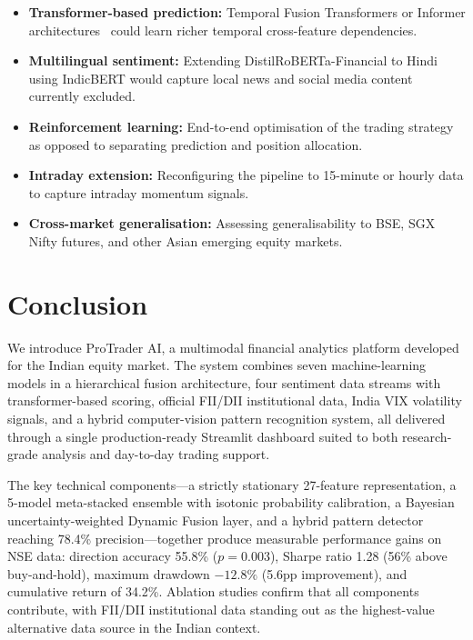 \documentclass[10pt,a4paper,twoside]{article}
\begin{document}
\begin{itemize}
\item \textbf{Transformer-based prediction:} Temporal Fusion Transformers or
  Informer architectures~\cite{vaswani2017} could learn richer temporal
  cross-feature dependencies.
\item \textbf{Multilingual sentiment:} Extending DistilRoBERTa-Financial to
  Hindi using IndicBERT would capture local news and social media content
  currently excluded.
\item \textbf{Reinforcement learning:} End-to-end optimisation of the trading
  strategy as opposed to separating prediction and position allocation.
\item \textbf{Intraday extension:} Reconfiguring the pipeline to 15-minute or
  hourly data to capture intraday momentum signals.
\item \textbf{Cross-market generalisation:} Assessing generalisability to
  BSE, SGX Nifty futures, and other Asian emerging equity markets.
\end{itemize}

\section{Conclusion}

We introduce ProTrader AI, a multimodal financial analytics platform developed
for the Indian equity market. The system combines seven machine-learning
models in a hierarchical fusion architecture, four sentiment data streams with
transformer-based scoring, official FII/DII institutional data, India VIX
volatility signals, and a hybrid computer-vision pattern recognition system,
all delivered through a single production-ready Streamlit dashboard suited to
both research-grade analysis and day-to-day trading support.

The key technical components---a strictly stationary 27-feature representation,
a 5-model meta-stacked ensemble with isotonic probability calibration, a
Bayesian uncertainty-weighted Dynamic Fusion layer, and a hybrid pattern
detector reaching 78.4\% precision---together produce measurable performance
gains on NSE data: direction accuracy 55.8\% ($p = 0.003$), Sharpe ratio 1.28
(56\% above buy-and-hold), maximum drawdown $-12.8\%$ (5.6pp improvement), and
cumulative return of 34.2\%. Ablation studies confirm that all components
contribute, with FII/DII institutional data standing out as the highest-value
alternative data source in the Indian context.
\end{document}
